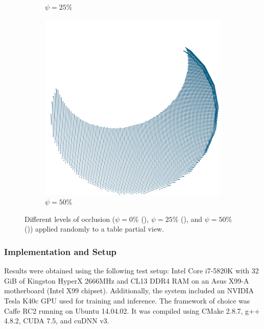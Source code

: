 \begin{figure}[!b]
\begin{subfigure}{0.32\textwidth}
		\caption{$\psi=25\%$}
		\label{subfig:objrecog:occlusion:25}
	\end{subfigure}
	\hfill
	\begin{subfigure}{0.32\textwidth}
		\centering
		\includegraphics[width=\linewidth]{Figures/ObjRecog/occlusion_50}
		\caption{$\psi=50\%$}
		\label{subfig:objrecog:occlusion:50}
	\end{subfigure}
	\hfill
	\caption{Different levels of occlusion ($\psi=0\%$ (), $\psi=25\%$ (), and $\psi=50\%$ ()) applied randomly to a table partial view.}
	\label{fig:objrecog:occlusion}
\end{figure}

\subsubsection{Implementation and Setup}
\label{cha:objrecog:sec:study:subsec:experiments:subsubsec:setup}


Results were obtained using the following test setup: Intel Core i7-5820K with 32 GiB of Kingston HyperX 2666MHz and CL13 DDR4 RAM on an Asus X99-A motherboard (Intel X99 chipset). Additionally, the system included an NVIDIA Tesla K40c GPU used for training and inference. The framework of choice was Caffe RC2 running on Ubuntu 14.04.02. It was compiled using CMake 2.8.7, g++ 4.8.2, CUDA 7.5, and cuDNN v3.


